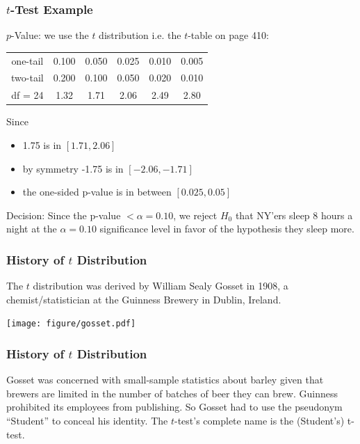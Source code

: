\documentclass[handout]{beamer}
\newcommand{\blue}[1]{\textcolor{blue2}{#1}}
\begin{document}
\begin{frame}
\frametitle{$t$-Test Example}

$p$-Value: we use the $t$ distribution i.e. the $t$-table on page 410:
\begin{center}
\begin{tabular}{c|ccccc}
\hline
one-tail & 0.100 & 0.050 & 0.025 & 0.010 & 0.005\\
two-tail & 0.200 & 0.100 & 0.050 & 0.020 & 0.010\\
\hline
df = 24 & 1.32 & 1.71 & 2.06 & 2.49 & 2.80\\
\hline
\end{tabular}
\end{center}


\pause Since 
\begin{itemize}
\item 1.75 is in $[1.71, 2.06]$
\item by symmetry -1.75 is in $[-2.06, -1.71]$
\item the one-sided p-value is in between $[0.025, 0.05]$
\end{itemize}
\vspace{0.5cm}


\pause Decision: Since the p-value $< \alpha=0.10$, we reject $H_0$ that NY'ers sleep 8 hours a night at the $\alpha=0.10$ significance level in favor of the hypothesis they sleep more.
\end{frame}


\begin{frame}
\frametitle{History of $t$ Distribution}
The $t$ distribution was derived by William Sealy Gosset in 1908, a chemist/statistician at the Guinness Brewery in Dublin, Ireland.
\begin{center}
\texttt{[image: figure/gosset.pdf]}
\end{center}
\end{frame}


\begin{frame}
\frametitle{History of $t$ Distribution}
Gosset was concerned with \blue{small-sample statistics} about barley given that brewers are limited in the number of batches of beer they can brew.
\pause \vskip 0.5cm
Guinness prohibited its employees from publishing.  So Gosset had to use the pseudonym ``Student'' to conceal his identity.
\pause \vskip 0.5cm
The $t$-test's complete name is the \blue{(Student's) t-test}.  
\end{frame}
\end{document}
